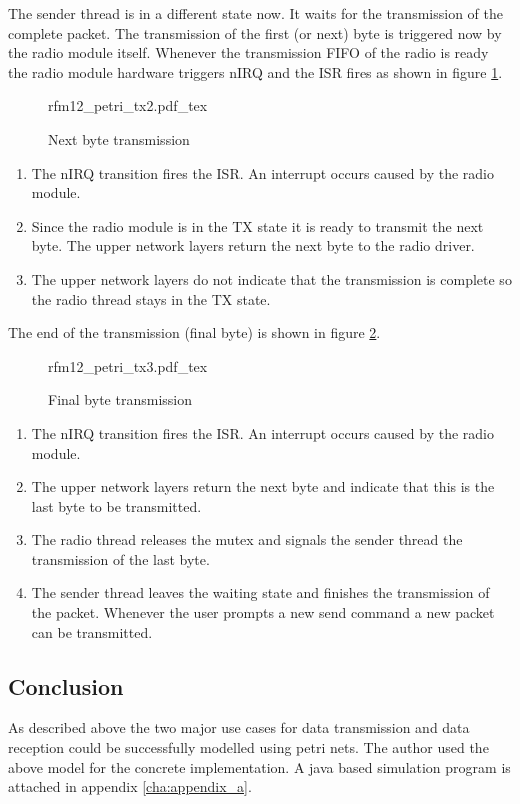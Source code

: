 The sender thread is in a different state now. It waits for the transmission of the complete packet. The transmission of the first (or next) byte is triggered now by the radio module itself. Whenever the transmission FIFO of the radio is ready the radio module hardware triggers nIRQ and the ISR fires as shown in figure \ref{fig:petri-tx2}.

\begin{figure}[H]
\centering
{rfm12_petri_tx2.pdf_tex}
\caption{Next byte transmission}
\label{fig:petri-tx2}
\end{figure}

\begin{enumerate}
    \item The nIRQ transition fires the ISR. An interrupt occurs caused by the radio module.
    \item Since the radio module is in the TX state it is ready to transmit the next byte. The upper network layers return the next byte to the radio driver.
    \item The upper network layers do not indicate that the transmission is complete so the radio thread stays in the TX state.
\end{enumerate}

The end of the transmission (final byte) is shown in figure \ref{fig:petri-tx3}.

\begin{figure}[H]
\centering
{rfm12_petri_tx3.pdf_tex}
\caption{Final byte transmission}
\label{fig:petri-tx3}
\end{figure}

\begin{enumerate}
    \item The nIRQ transition fires the ISR. An interrupt occurs caused by the radio module.
    \item The upper network layers return the next byte and indicate that this is the last byte to be transmitted.
    \item The radio thread releases the mutex and signals the sender thread the transmission of the last byte.
    \item The sender thread leaves the waiting state and finishes the transmission of the packet. Whenever the user prompts a new send command a new packet can be transmitted.
\end{enumerate}

\pagebreak
\begin{samepage} %
\subsection{Conclusion} %
As described above the two major use cases for data transmission and data reception could be successfully modelled using petri nets. The author used the above model for the concrete implementation. A java based simulation program is attached in appendix \ref{cha:appendix_a}.
\end{samepage}
